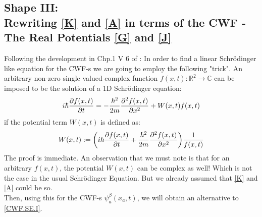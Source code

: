 \documentclass[11pt, a4paper]{article} %
\newcommand{\R}{\mathbb{R}} %
\newcommand{\C}{\mathbb{C}}
\begin{document}
\subsection{Shape III: \\ Rewriting \ref{K} and \ref{A} in terms of the CWF - The Real Potentials \ref{G} and \ref{J}}
Following the development in Chp.1 V 6 of \cite{JordiXO}: In order to find a linear Schrödinger like equation for the CWF-s we are going to employ the following "trick". An arbitrary non-zero single valued complex function $f(x, t):\R^2 \rightarrow \C$ can be imposed to be the solution of a 1D Schrödinger equation:\vspace{-0.3cm}
$$
i \hbar \pdv{f(x,t)}{t} = -\frac{\hbar^2}{2 m}\pdv[2]{f(x,t)}{x} + W(x,t) f(x,t)
$$
if the potential term $W(x, t)$ is defined as:\vspace{-0.3cm}
$$
W(x, t) := \qty(i \hbar \pdv{f(x,t)}{t} +\frac{\hbar^2}{2 m}\pdv[2]{f(x,t)}{x} ) \frac{1}{f(x,t)}\vspace{-0.3cm}
$$
The proof is immediate. An observation that we must note is that for an arbitrary $f(x,t)$, the potential $W(x,t)$ can be complex as well! Which is not the case in the usual Schrödinger Equation. But we already assumed that \ref{K} and \ref{A} could be so. \vspace{-0.3cm}\\

Then, using this for the CWF-s $\psi_a^\beta(x_a,t)$, we will obtain an alternative to \ref{CWF.SE.I}.
\end{document}
